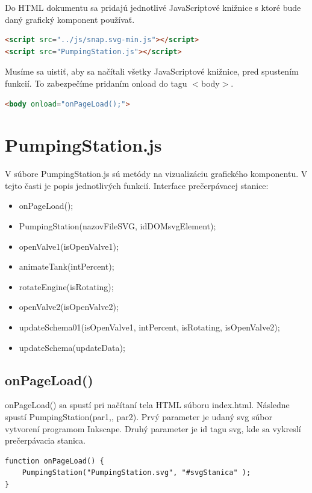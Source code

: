 Do HTML dokumentu sa pridajú jednotlivé JavaScriptové knižnice s ktoré bude daný grafický komponent používať. 
\begin{lstlisting}[language = HTML]
<script src="../js/snap.svg-min.js"></script>
<script src="PumpingStation.js"></script>
\end{lstlisting}

Musíme sa uistiť, aby sa načítali všetky JavaScriptové knižnice, pred spustením funkcií. To zabezpečíme pridaním  onload do tagu $<$body$>$. 
\begin{lstlisting}[language = HTML]
	<body onload="onPageLoad();">
\end{lstlisting}



\section{PumpingStation.js}
V súbore PumpingStation.js sú metódy na vizualizáciu grafického komponentu. V tejto časti je popis jednotlivých funkcií. 
Interface prečerpávacej stanice: 
\begin{itemize}
	\item onPageLoad();
	\item PumpingStation(nazovFileSVG, idDOMsvgElement);
    \item openValve1(isOpenValve1);
    \item animateTank(intPercent);
    \item rotateEngine(isRotating);
    \item openValve2(isOpenValve2);
    \item updateSchema01(isOpenValve1, intPercent, isRotating, isOpenValve2);
    \item updateSchema(updateData);
\end{itemize}

\subsection{onPageLoad()}
onPageLoad() sa spustí pri načítaní tela HTML súboru index.html. Následne spustí  PumpingStation(par1,, par2). Prvý parameter je udaný svg súbor vytvorení programom Inkscape. Druhý parameter je id tagu svg, kde sa vykreslí prečerpávacia stanica.

\begin{lstlisting}
function onPageLoad() {
	PumpingStation("PumpingStation.svg", "#svgStanica" );
}
\end{lstlisting}


